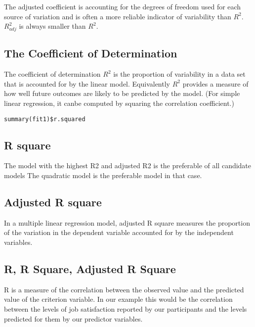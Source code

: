 \documentclass[a4paper,12pt]{article}
\begin{document}
The adjusted coefficient is accounting for the degrees of freedom
used for each source of variation and is often a more reliable
indicator of variability than $R^2$. $R^2_{adj}$ is always smaller
than $R^2$.
\subsection{The Coefficient of Determination}
The coefficient of determination $R^2$ is the proportion of variability in a data set that is accounted for by the linear model.
Equivalently $R^2$ provides a measure of how well future outcomes are likely to be predicted by the model.
(For simple linear regression, it canbe computed by squaring the correlation coefficient.)
\begin{framed}
\begin{verbatim}
summary(fit1)$r.squared
\end{verbatim}
\end{framed}
\newpage

\subsection{R square}
The model with the highest R2 and adjusted R2  is the preferable of all candidate models
The quadratic model is the preferable model in that case.

\subsection{Adjusted R square}

In a multiple linear regression model, adjusted R square measures the proportion of the variation in the dependent variable accounted for by the independent variables.


\subsection{R, R Square, Adjusted R Square}

R is a measure of the correlation between the observed value and the predicted value of the criterion variable. In our example this would be the correlation between the levels of job satisfaction reported by our participants and the levels predicted for
them by our predictor variables.
\end{document}
